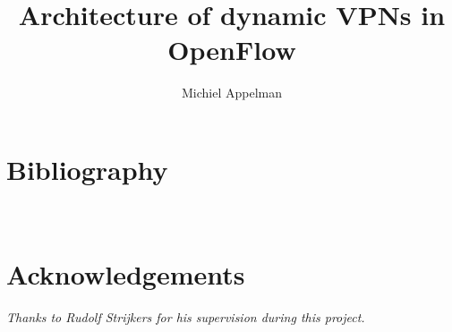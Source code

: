 \documentclass[oneside,8pt,a4paper]{article}
\title{Architecture of dynamic VPNs in OpenFlow}
\author{Michiel Appelman}
\begin{document}
	
	
	
	\clearpage

	\acresetall
	\setlength{\parskip}{0ex plus 0.5ex minus 0.2ex}
	
	\tableofcontents
	\clearpage

	\listoffigures
	\listoftables
	\clearpage
	
	\acresetall
		\setlength{\parskip}{1.3ex plus 0.2ex minus 0.2ex}
		\pagestyle{fancy}
		\renewcommand{\sectionmark}[1]{%
		\markboth{#1}{}}
		\fancyhead[L]{\small{\nouppercase{\leftmark}}}
		\fancyhead[R]{\nouppercase{\emph{\chaptername\ \LARGE{\thesection}}}}
		\renewcommand{\headrulewidth}{0.5pt}
		

		
		\clearpage
		
				
		\clearpage
		
				
		\clearpage
		
		
						
		\clearpage
		
						
		\clearpage
		
		\appendix
		\noappendicestocpagenum
		\addappheadtotoc
		\pagestyle{fancy}
		\renewcommand{\sectionmark}[1]{%
		\markboth{#1}{}}
		\fancyhead[L]{\small{\nouppercase{\leftmark}}}
		\fancyhead[R]{\nouppercase{\emph{\appendixname\ \LARGE{\thesection}}}}
		\renewcommand{\headrulewidth}{0.5pt}

		
		\clearpage

		\renewcommand*{\refname}{} %
		\section{Bibliography}
		
		

		\clearpage
		\pagestyle{empty}
		\hfill \\[6cm]
		\section*{Acknowledgements}
		\textsl{Thanks to Rudolf Strijkers for his supervision during this project.}
\end{document}
